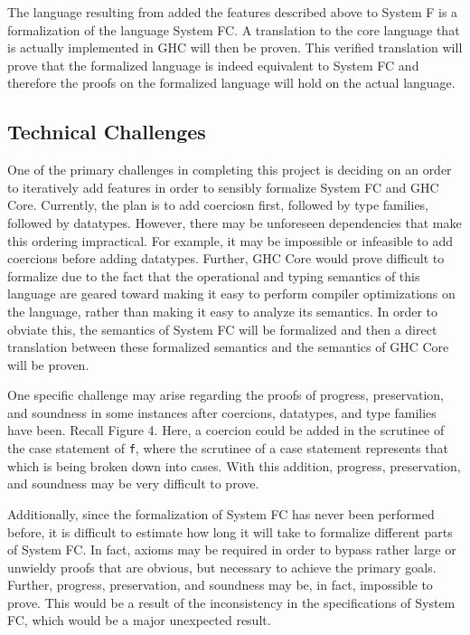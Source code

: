 \documentclass{sig-alternate}
\begin{document}
The language resulting from added the features described above to System F is a formalization of the language System FC.  A translation to the core language that is actually implemented in GHC will then be proven. This verified translation will prove that the formalized language is indeed equivalent to System FC and therefore the proofs on the formalized language will hold on the actual language.

\subsection{Technical Challenges}
\label{subsec:tech_challenges}
One of the primary challenges in completing this project is deciding on an order to iteratively add features in order to sensibly formalize System FC and GHC Core. Currently, the plan is to add coerciosn first, followed by type families, followed by datatypes. However, there may be unforeseen dependencies that make this ordering impractical. For example, it may be impossible or infeasible to add coercions before adding datatypes. Further, GHC Core would prove difficult to formalize due to the fact that the operational and typing semantics of this language are geared toward making it easy to perform compiler optimizations on the language, rather than making it easy to analyze its semantics. In order to obviate this, the semantics of System FC will be formalized and then a direct translation between these formalized semantics and the semantics of GHC Core will be proven.

One specific challenge may arise regarding the proofs of progress, preservation, and soundness in some instances after coercions, datatypes, and type families have been. Recall Figure 4. Here, a coercion could be added in the scrutinee of the case statement of \texttt{f}, where the scrutinee of a case statement represents that which is being broken down into cases. With this addition, progress, preservation, and soundness may be very difficult to prove.

Additionally, since the formalization of System FC has never been performed before, it is difficult to estimate how long it will take to formalize different parts of System FC. In fact, axioms may be required in order to bypass rather large or unwieldy proofs that are obvious, but necessary to achieve the primary goals. Further, progress, preservation, and soundness may be, in fact, impossible to prove. This would be a result of the inconsistency in the specifications of System FC, which would be a major unexpected result.
\end{document}
